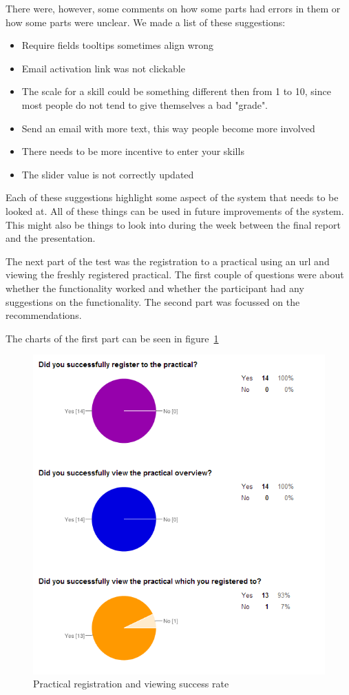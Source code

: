 There were, however, some comments on how some parts had errors in them or how some parts were unclear. We made a list of these suggestions:
\begin{itemize}
\item Require fields tooltips sometimes align wrong
\item Email activation link was not clickable
\item The scale for a skill could be something different then from 1 to 10, since most people do not tend to give themselves a bad "grade".
\item Send an email with more text, this way people become more involved
\item There needs to be more incentive to enter your skills
\item The slider value is not correctly updated
\end{itemize}

Each of these suggestions highlight some aspect of the system that needs to be looked at.
All of these things can be used in future improvements of the system.
This might also be things to look into during the week between the final report and the presentation.

The next part of the test was the registration to a practical using an url and viewing the freshly registered practical.
The first couple of questions were about whether the functionality worked and whether the participant had any suggestions on the functionality.
The second part was focussed on the recommendations.

The charts of the first part can be seen in figure~\ref{register_practical_chart}\\
\begin{figure}[H]
    \centering
    \includegraphics[width=\textwidth]{images/register_practical_chart}
    \caption{Practical registration and viewing success rate}
    \label{register_practical_chart}
\end{figure}

